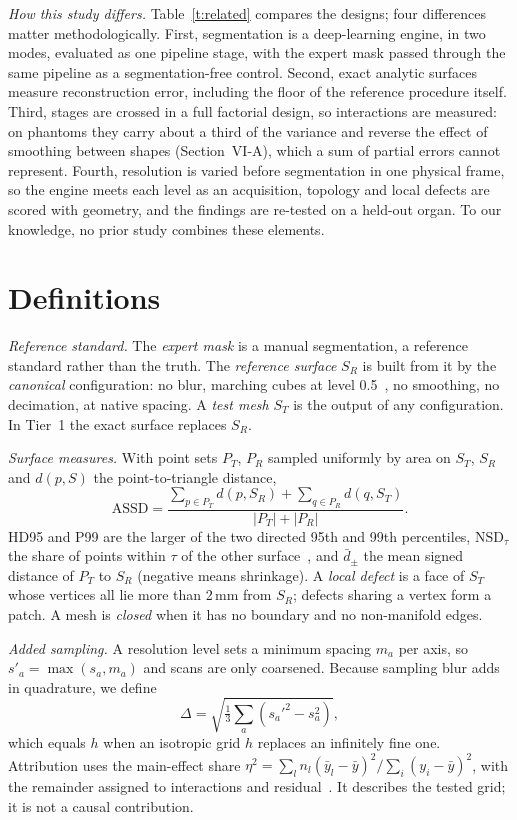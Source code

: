 \documentclass[conference]{IEEEtran}
\newcommand{\mm}{\,mm\xspace}
\begin{document}
\emph{How this study differs.} Table~\ref{t:related} compares the designs; four differences matter methodologically. First, segmentation is a deep-learning engine, in two modes, evaluated as one pipeline stage, with the expert mask passed through the same pipeline as a segmentation-free control. Second, exact analytic surfaces measure reconstruction error, including the floor of the reference procedure itself. Third, stages are crossed in a full factorial design, so interactions are measured: on phantoms they carry about a third of the variance and reverse the effect of smoothing between shapes (Section~VI-A), which a sum of partial errors cannot represent. Fourth, resolution is varied before segmentation in one physical frame, so the engine meets each level as an acquisition, topology and local defects are scored with geometry, and the findings are re-tested on a held-out organ. To our knowledge, no prior study combines these elements.

\section{Definitions}
\emph{Reference standard.} The \emph{expert mask} is a manual segmentation, a reference standard rather than the truth. The \emph{reference surface} $S_R$ is built from it by the \emph{canonical} configuration: no blur, marching cubes at level 0.5~\cite{lewiner2003marching}, no smoothing, no decimation, at native spacing. A \emph{test mesh} $S_T$ is the output of any configuration. In Tier~1 the exact surface replaces $S_R$.

\emph{Surface measures.} With point sets $P_T$, $P_R$ sampled uniformly by area on $S_T$, $S_R$ and $d(p,S)$ the point-to-triangle distance,
\begin{equation}
\text{ASSD}=\frac{\sum_{p\in P_T}d(p,S_R)+\sum_{q\in P_R}d(q,S_T)}{|P_T|+|P_R|}.
\end{equation}
HD95 and P99 are the larger of the two directed 95th and 99th percentiles, $\text{NSD}_\tau$ the share of points within $\tau$ of the other surface~\cite{nikolov2021nsd}, and $\bar d_{\pm}$ the mean signed distance of $P_T$ to $S_R$ (negative means shrinkage). A \emph{local defect} is a face of $S_T$ whose vertices all lie more than 2\mm from $S_R$; defects sharing a vertex form a patch. A mesh is \emph{closed} when it has no boundary and no non-manifold edges.

\emph{Added sampling.} A resolution level sets a minimum spacing $m_a$ per axis, so $s'_a=\max(s_a,m_a)$ and scans are only coarsened. Because sampling blur adds in quadrature, we define
\begin{equation}
\Delta=\sqrt{\tfrac{1}{3}\textstyle\sum_{a}\left(s_a'^2-s_a^2\right)},\label{e:delta}
\end{equation}
which equals $h$ when an isotropic grid $h$ replaces an infinitely fine one. Attribution uses the main-effect share $\eta^2=\sum_l n_l(\bar y_l-\bar y)^2/\sum_i(y_i-\bar y)^2$, with the remainder assigned to interactions and residual~\cite{montgomery2017doe}. It describes the tested grid; it is not a causal contribution.
\end{document}
